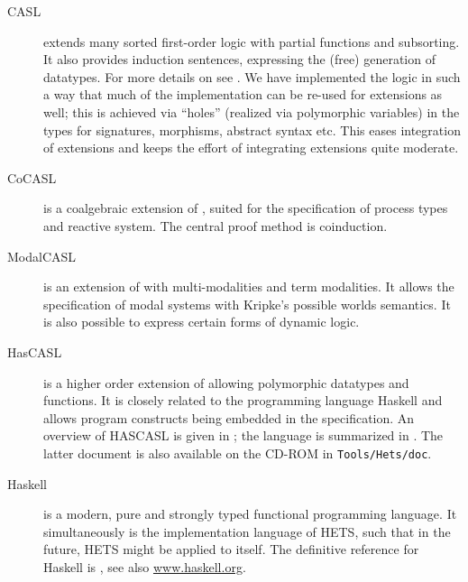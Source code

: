 \documentclass{article}
\newcommand{\normalTEXTSC}[2]{{#1\scriptsize#2}}
\newcommand     {\Hets}{\normalTEXTSC{H}{ETS}\xspace}
\newcommand{\Dolce}{\textmd{\textsc{Dolce}}\xspace}
\newcommand     {\HasCASL}{\normalTEXTSC{H}{AS}\normalTEXTSC{C}{ASL}\xspace}
\begin{document}
\begin{description}
  
\item[CASL] extends many sorted first-order logic with partial
  functions and subsorting.  It also provides induction sentences,
  expressing the (free) generation of datatypes.
For more details on \CASL see \cite{CASL-RM,CASL-UM}.
%
We have implemented the \CASL logic in such a way that much of the
implementation can be re-used for \CASL extensions as well; this
is achieved via ``holes'' (realized via polymorphic variables) in the
types for signatures, morphisms, abstract syntax etc.  This eases
integration of \CASL extensions and keeps the effort of integrating
\CASL extensions quite moderate.

\item[CoCASL] \cite{MossakowskiEA04} is a coalgebraic extension of \CASL,
suited for the specification of process types and reactive system.
The central proof method is coinduction.

\item[ModalCASL] is an extension of \CASL with multi-modalities and
term modalities. It allows the specification of modal systems with 
Kripke's possible worlds semantics. It is also possible to express
certain forms of dynamic logic. 

\item[HasCASL] is a higher order extension of \CASL allowing
  polymorphic datatypes and functions. It is closely related to the
  programming language Haskell and allows program constructs being
  embedded in the specification. 
  An overview of \HasCASL is given in \cite{Schroeder:2002:HIS};
the language is summarized in \cite{HasCASL/Summary}.
The latter document is also available on the CD-ROM 
in \texttt{Tools/Hets/doc}.

\item[Haskell] is a modern, pure and strongly typed functional
  programming language. It simultaneously is the implementation
  language of \Hets, such that in the future, \Hets might be applied
  to itself.
The definitive reference for Haskell is \cite{PeytonJones03},
see also \url{www.haskell.org}. 
  

\end{description}
\end{document}
